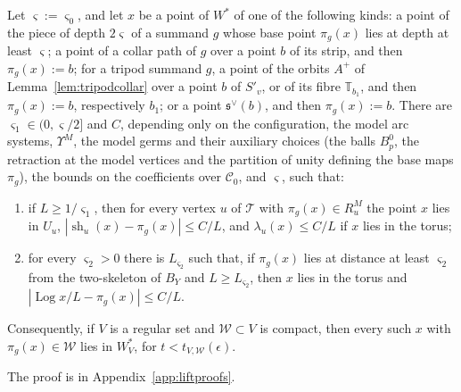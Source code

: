 \begin{lemma}\label{lem:interface}
Let $\varsigma:=\varsigma_0$, and let $x$ be a point of $W^*$ of one of the following kinds: a point of the piece
of depth $2\varsigma$ of a summand $g$ whose base point $\pi_g(x)$ lies at depth at least $\varsigma$; a point of a
collar path of $g$ over a point $b$ of its strip, and then $\pi_g(x):=b$; for a tripod summand $g$, a point of the
orbits $A^+$ of Lemma~\ref{lem:tripodcollar} over a point $b$ of $S'_v$, or of its fibre $\mathbb T_{b_1}$, and then
$\pi_g(x):=b$, respectively $b_1$; or a point $\mathfrak s^\vee(b)$, and then $\pi_g(x):=b$. There are $\varsigma_1\in(0,\varsigma/2]$ and $C$, depending only on the configuration, the model arc
systems, $\Upsilon^M$, the model germs and their auxiliary choices (the balls $B^0_p$, the retraction at the model
vertices and the partition of unity defining the base maps $\pi_g$), the bounds on the coefficients over $\mathscr C_0$,
and $\varsigma$, such that:
\begin{enumerate}
\item if $L\ge1/\varsigma_1$, then for every vertex $u$ of $\mathcal T$ with $\pi_g(x)\in R^M_u$ the point $x$ lies in $U_u$,
$|\operatorname{sh}_u(x)-\pi_g(x)|\le C/L$, and $\lambda_u(x)\le C/L$ if $x$ lies in the torus;
\item for every $\varsigma_2>0$ there is $L_{\varsigma_2}$ such that, if $\pi_g(x)$ lies at distance at least $\varsigma_2$ from
the two-skeleton of $B_Y$ and $L\ge L_{\varsigma_2}$, then $x$ lies in the torus and $|\operatorname{Log}x/L-\pi_g(x)|\le C/L$.
\end{enumerate}
Consequently, if $V$ is a regular set and $\mathcal W\subset V$ is compact, then every such $x$ with $\pi_g(x)\in\mathcal W$
lies in $W^*_V$, for $t<t_{V,\mathcal W}(\epsilon)$.
\end{lemma}

The proof is in Appendix~\ref{app:liftproofs}.

